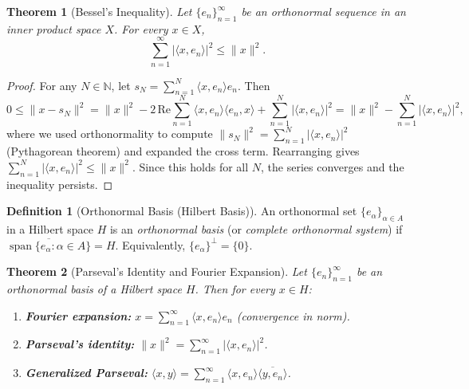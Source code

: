 \documentclass[11pt,a4paper]{article}
\theoremstyle{definition}
\newtheorem{definition}{Definition}[section]
\theoremstyle{plain}
\newtheorem{theorem}{Theorem}[section]
\theoremstyle{remark}
\newcommand{\N}{\mathbb{N}}
\DeclareMathOperator{\spn}{span}
\begin{document}
\begin{theorem}[Bessel's Inequality]\label{thm:bessel}
Let $\{e_n\}_{n=1}^\infty$ be an orthonormal sequence in an inner product
space $X$. For every $x \in X$,
\[
    \sum_{n=1}^\infty |\langle x, e_n \rangle|^2 \leq \|x\|^2.
\]
\end{theorem}

\begin{proof}
For any $N \in \N$, let $s_N = \sum_{n=1}^N \langle x, e_n \rangle e_n$.
Then
\[
    0 \leq \|x - s_N\|^2
    = \|x\|^2 - 2\,\mathrm{Re}\sum_{n=1}^N \langle x, e_n \rangle
      \langle e_n, x \rangle + \sum_{n=1}^N |\langle x, e_n \rangle|^2
    = \|x\|^2 - \sum_{n=1}^N |\langle x, e_n \rangle|^2,
\]
where we used orthonormality to compute $\|s_N\|^2 = \sum_{n=1}^N
|\langle x, e_n \rangle|^2$ (Pythagorean theorem) and expanded the cross term.
Rearranging gives $\sum_{n=1}^N |\langle x, e_n \rangle|^2 \leq \|x\|^2$.
Since this holds for all $N$, the series converges and the inequality persists.
\end{proof}

\begin{definition}[Orthonormal Basis (Hilbert Basis)]\label{def:onb}
An orthonormal set $\{e_\alpha\}_{\alpha \in A}$ in a Hilbert space $H$ is an
\emph{orthonormal basis} (or \emph{complete orthonormal system}) if
$\overline{\spn\{e_\alpha : \alpha \in A\}} = H$.
Equivalently, $\{e_\alpha\}^\perp = \{0\}$.
\end{definition}

\begin{theorem}[Parseval's Identity and Fourier Expansion]\label{thm:parseval}
Let $\{e_n\}_{n=1}^\infty$ be an orthonormal basis of a Hilbert space $H$.
Then for every $x \in H$:
\begin{enumerate}[label=(\roman*)]
    \item \textbf{Fourier expansion:}
          $x = \sum_{n=1}^\infty \langle x, e_n \rangle e_n$
          (convergence in norm).
    \item \textbf{Parseval's identity:}
          $\|x\|^2 = \sum_{n=1}^\infty |\langle x, e_n \rangle|^2$.
    \item \textbf{Generalized Parseval:}
          $\langle x, y \rangle = \sum_{n=1}^\infty \langle x, e_n \rangle
          \overline{\langle y, e_n \rangle}$.
\end{enumerate}
\end{theorem}
\end{document}
